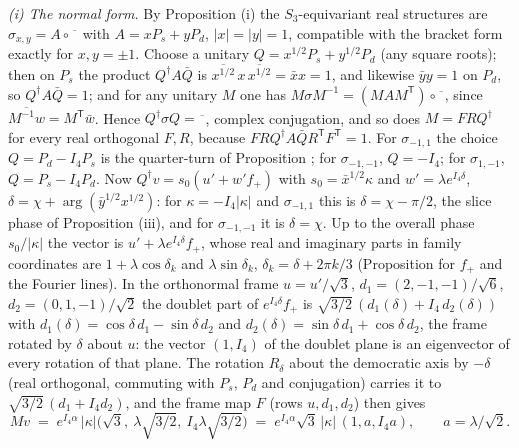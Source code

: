 \emph{(i) The normal form.} By Proposition (i) the $S_{3}$-equivariant real structures are $\sigma_{x,y} = A\circ\overline{\phantom{v}}$ with $A = xP_{s} + yP_{d}$, $|x| = |y| = 1$, compatible with the bracket form exactly for $x, y = \pm1$. Choose a unitary $Q = x^{1/2}P_{s} + y^{1/2}P_{d}$ (any square roots); then on $P_{s}$ the product $Q^{\dagger}A\bar{Q}$ is $\overline{x^{1/2}}\,x\,\overline{x^{1/2}} = \bar{x}x = 1$, and likewise $\bar{y}y = 1$ on $P_{d}$, so $Q^{\dagger}A\bar{Q} = 1$; and for any unitary $M$ one has $M\sigma M^{-1} = (MAM^{\mathsf T})\circ\overline{\phantom{v}}$, since $\overline{M^{-1}w} = M^{\mathsf T}\bar{w}$. Hence $Q^{\dagger}\sigma Q = \overline{\phantom{v}}$, complex conjugation, and so does $M = FRQ^{\dagger}$ for every real orthogonal $F, R$, because $FRQ^{\dagger}A\bar{Q}R^{\mathsf T}F^{\mathsf T} = 1$. For $\sigma_{-1,1}$ the choice $Q = P_{d} - I_4 P_{s}$ is the quarter-turn of Proposition ; for $\sigma_{-1,-1}$, $Q = -I_4$; for $\sigma_{1,-1}$, $Q = P_{s} - I_4 P_{d}$. Now $Q^{\dagger}v = s_{0}(u' + w'f_{+})$ with $s_{0} = \bar{x}^{1/2}\kappa$ and $w' = \lambda e^{I_4\delta}$, $\delta = \chi + \arg(\bar{y}^{1/2}x^{1/2})$: for $\kappa = -I_4|\kappa|$ and $\sigma_{-1,1}$ this is $\delta = \chi - \pi/2$, the slice phase of Proposition (iii), and for $\sigma_{-1,-1}$ it is $\delta = \chi$. Up to the overall phase $s_{0}/|\kappa|$ the vector is $u' + \lambda e^{I_4\delta}f_{+}$, whose real and imaginary parts in family coordinates are $1 + \lambda\cos\delta_{k}$ and $\lambda\sin\delta_{k}$, $\delta_{k} = \delta + 2\pi k/3$ (Proposition  for $f_{+}$ and the Fourier lines). In the orthonormal frame $u = u'/\sqrt3$, $d_{1} = (2,-1,-1)/\sqrt6$, $d_{2} = (0,1,-1)/\sqrt2$ the doublet part of $e^{I_4\delta}f_{+}$ is $\sqrt{3/2}\,(d_{1}(\delta) + I_4\,d_{2}(\delta))$ with $d_{1}(\delta) = \cos\delta\,d_{1} - \sin\delta\,d_{2}$ and $d_{2}(\delta) = \sin\delta\,d_{1} + \cos\delta\,d_{2}$, the frame rotated by $\delta$ about $u$: the vector $(1, I_4)$ of the doublet plane is an eigenvector of every rotation of that plane. The rotation $R_{\delta}$ about the democratic axis by $-\delta$ (real orthogonal, commuting with $P_{s}$, $P_{d}$ and conjugation) carries it to $\sqrt{3/2}\,(d_{1} + I_4 d_{2})$, and the frame map $F$ (rows $u, d_{1}, d_{2}$) then gives
\[
M v \;=\; e^{I_4\alpha}\,|\kappa|\bigl(\sqrt3,\ \lambda\sqrt{3/2},\ I_4\lambda\sqrt{3/2}\bigr) \;=\; e^{I_4\alpha}\sqrt3\,|\kappa|\,(1, a, I_4 a), \qquad a = \lambda/\sqrt2 .
\]
